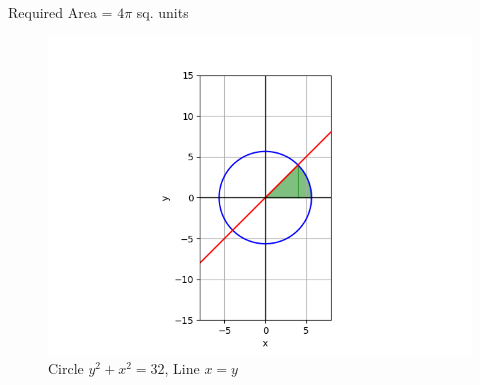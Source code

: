 \documentclass[journal]{IEEEtran}
\begin{document}
Required Area = $4\pi$ sq. units
\begin{figure}[h!]
   \centering
   \includegraphics[width = 1\linewidth]{figs/fig.png}
   \caption{Circle $y^2+x^2=32$, Line $x=y$}
   \label{stemplot}
\end{figure}
\end{document}

